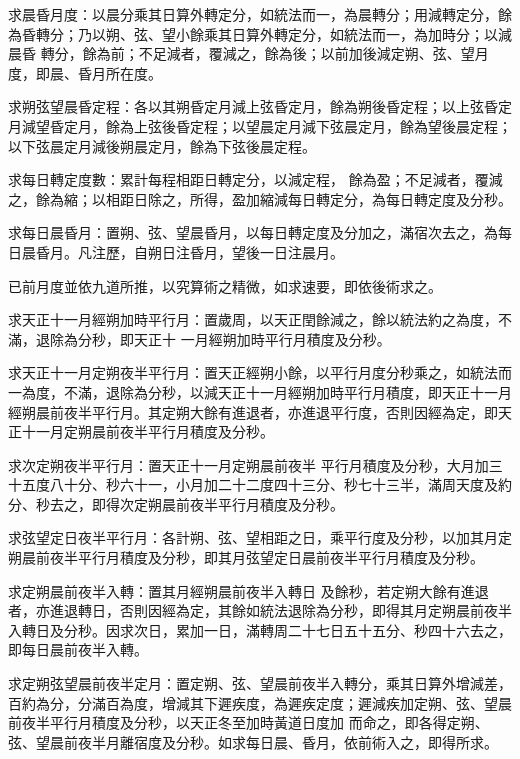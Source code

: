 \begin{pinyinscope}
 求晨昏月度：以晨分乘其日算外轉定分，如統法而一，為晨轉分；用減轉定分，餘為昏轉分；乃以朔、弦、望小餘乘其日算外轉定分，如統法而一，為加時分；以減晨昏
 轉分，餘為前；不足減者，覆減之，餘為後；以前加後減定朔、弦、望月度，即晨、昏月所在度。



 求朔弦望晨昏定程：各以其朔昏定月減上弦昏定月，餘為朔後昏定程；以上弦昏定月減望昏定月，餘為上弦後昏定程；以望晨定月減下弦晨定月，餘為望後晨定程；以下弦晨定月減後朔晨定月，餘為下弦後晨定程。



 求每日轉定度數：累計每程相距日轉定分，以減定程，
 餘為盈；不足減者，覆減之，餘為縮；以相距日除之，所得，盈加縮減每日轉定分，為每日轉定度及分秒。



 求每日晨昏月：置朔、弦、望晨昏月，以每日轉定度及分加之，滿宿次去之，為每日晨昏月。凡注歷，自朔日注昏月，望後一日注晨月。



 已前月度並依九道所推，以究算術之精微，如求速要，即依後術求之。



 求天正十一月經朔加時平行月：置歲周，以天正閏餘減之，餘以統法約之為度，不滿，退除為分秒，即天正十
 一月經朔加時平行月積度及分秒。



 求天正十一月定朔夜半平行月：置天正經朔小餘，以平行月度分秒乘之，如統法而一為度，不滿，退除為分秒，以減天正十一月經朔加時平行月積度，即天正十一月經朔晨前夜半平行月。其定朔大餘有進退者，亦進退平行度，否則因經為定，即天正十一月定朔晨前夜半平行月積度及分秒。



 求次定朔夜半平行月：置天正十一月定朔晨前夜半
 平行月積度及分秒，大月加三十五度八十分、秒六十一，小月加二十二度四十三分、秒七十三半，滿周天度及約分、秒去之，即得次定朔晨前夜半平行月積度及分秒。



 求弦望定日夜半平行月：各計朔、弦、望相距之日，乘平行度及分秒，以加其月定朔晨前夜半平行月積度及分秒，即其月弦望定日晨前夜半平行月積度及分秒。



 求定朔晨前夜半入轉：置其月經朔晨前夜半入轉日
 及餘秒，若定朔大餘有進退者，亦進退轉日，否則因經為定，其餘如統法退除為分秒，即得其月定朔晨前夜半入轉日及分秒。因求次日，累加一日，滿轉周二十七日五十五分、秒四十六去之，即每日晨前夜半入轉。



 求定朔弦望晨前夜半定月：置定朔、弦、望晨前夜半入轉分，乘其日算外增減差，百約為分，分滿百為度，增減其下遲疾度，為遲疾定度；遲減疾加定朔、弦、望晨前夜半平行月積度及分秒，以天正冬至加時黃道日度加
 而命之，即各得定朔、弦、望晨前夜半月離宿度及分秒。如求每日晨、昏月，依前術入之，即得所求。




\end{pinyinscope}
